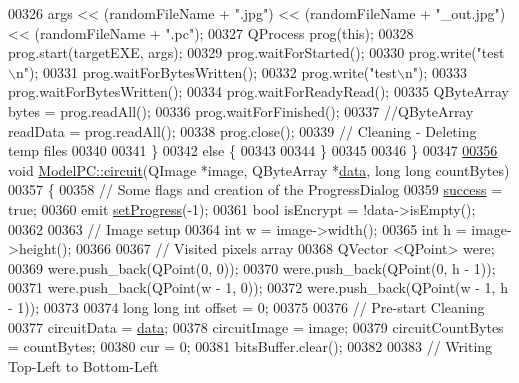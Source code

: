 \begin{DoxyCode}
00326         args << (randomFileName + \textcolor{stringliteral}{".jpg"}) << (randomFileName + \textcolor{stringliteral}{"\_out.jpg"}) << (randomFileName + \textcolor{stringliteral}{".pc"});
00327         QProcess prog(\textcolor{keyword}{this});
00328         prog.start(targetEXE, args);
00329         prog.waitForStarted();
00330         prog.write(\textcolor{stringliteral}{"test\(\backslash\)n"});
00331         prog.waitForBytesWritten();
00332         prog.write(\textcolor{stringliteral}{"test\(\backslash\)n"});
00333         prog.waitForBytesWritten();
00334         prog.waitForReadyRead();
00335         QByteArray bytes = prog.readAll();
00336         prog.waitForFinished();
00337         \textcolor{comment}{//QByteArray readData = prog.readAll();}
00338         prog.close();
00339         \textcolor{comment}{// Cleaning - Deleting temp files}
00340 
00341     \}
00342     \textcolor{keywordflow}{else} \{
00343 
00344     \}
00345 
00346 \}
00347 
\hypertarget{modelpc_8cpp_source_l00356}{}\hyperlink{class_model_p_c_a1d0091062a0c836b283ec2f67411623b}{00356} \textcolor{keywordtype}{void} \hyperlink{class_model_p_c_a1d0091062a0c836b283ec2f67411623b}{ModelPC::circuit}(QImage *image, QByteArray *\hyperlink{namespace_errors_dict_setup_adf4c30d205d29df7343e26f7c62b0685}{data}, \textcolor{keywordtype}{long} \textcolor{keywordtype}{long} countBytes)
00357 \{
00358     \textcolor{comment}{// Some flags and creation of the ProgressDialog}
00359     \hyperlink{class_model_p_c_a945ffbbc44a832b953c191debd448f4c}{success} = \textcolor{keyword}{true};
00360     emit \hyperlink{class_model_p_c_afdcd80f0ed5062e145a71f09b0897547}{setProgress}(-1);
00361     \textcolor{keywordtype}{bool} isEncrypt = !data->isEmpty();
00362 
00363     \textcolor{comment}{// Image setup}
00364     \textcolor{keywordtype}{int} w = image->width();
00365     \textcolor{keywordtype}{int} h = image->height();
00366 
00367     \textcolor{comment}{// Visited pixels array}
00368     QVector <QPoint> were;
00369     were.push\_back(QPoint(0, 0));
00370     were.push\_back(QPoint(0, h - 1));
00371     were.push\_back(QPoint(w - 1, 0));
00372     were.push\_back(QPoint(w - 1, h - 1));
00373 
00374     \textcolor{keywordtype}{long} \textcolor{keywordtype}{long} \textcolor{keywordtype}{int} offset = 0;
00375 
00376     \textcolor{comment}{// Pre-start Cleaning}
00377     circuitData = \hyperlink{namespace_errors_dict_setup_adf4c30d205d29df7343e26f7c62b0685}{data};
00378     circuitImage = image;
00379     circuitCountBytes = countBytes;
00380     cur = 0;
00381     bitsBuffer.clear();
00382 
00383     \textcolor{comment}{// Writing Top-Left to Bottom-Left}

\end{DoxyCode}
